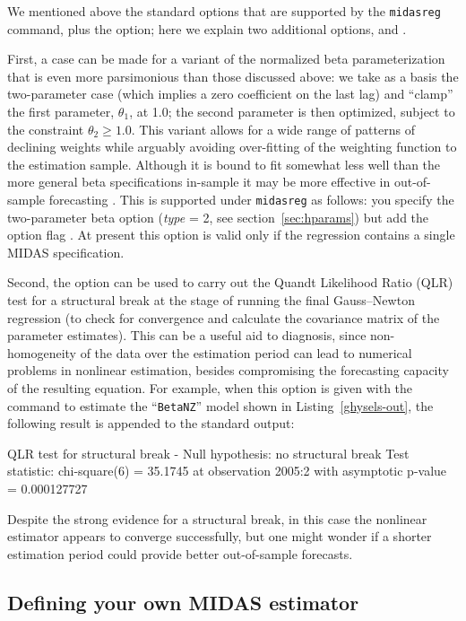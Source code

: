 \documentclass{article}
\begin{document}
We mentioned above the standard options that are supported by the
\texttt{midasreg} command, plus the  option; here we
explain two additional options,  and
.

First, a case can be made for a variant of the normalized beta
parameterization that is even more parsimonious than those discussed
above: we take as a basis the two-parameter case (which implies a zero
coefficient on the last lag) and ``clamp'' the first parameter,
$\theta_1$, at 1.0; the second parameter is then optimized, subject to
the constraint $\theta_2 \ge 1.0$. This variant allows for a wide
range of patterns of declining weights while arguably avoiding
over-fitting of the weighting function to the estimation sample.
Although it is bound to fit somewhat less well than the more general
beta specifications in-sample it may be more effective in
out-of-sample forecasting \citep{ghysels-qian16}. This is supported
under \texttt{midasreg} as follows: you specify the two-parameter beta
option (\textsl{type} = 2, see section~\ref{sec:hparams}) but add the
option flag . At present this option is valid only
if the regression contains a single MIDAS specification.

Second, the  option can be used to carry out the
Quandt Likelihood Ratio (QLR) test for a structural break at the stage
of running the final Gauss--Newton regression (to check for
convergence and calculate the covariance matrix of the parameter
estimates).  This can be a useful aid to diagnosis, since
non-homogeneity of the data over the estimation period can lead to
numerical problems in nonlinear estimation, besides compromising the
forecasting capacity of the resulting equation. For example, when this
option is given with the command to estimate the ``\texttt{BetaNZ}''
model shown in Listing~\ref{ghysels-out}, the following result is
appended to the standard output:
%
\begin{code}
QLR test for structural break -
  Null hypothesis: no structural break
  Test statistic: chi-square(6) = 35.1745 at observation 2005:2
  with asymptotic p-value = 0.000127727
\end{code}
%
Despite the strong evidence for a structural break, in this case the
nonlinear estimator appears to converge successfully, but one might
wonder if a shorter estimation period could provide better
out-of-sample forecasts.

\subsection{Defining your own MIDAS estimator}
\end{document}
